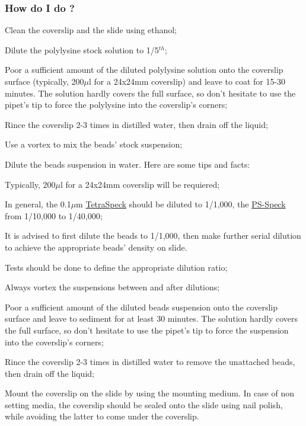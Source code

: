 \documentclass[a4paper, 11pt]{report}%
\begin{document}
\subsubsection{How do I do ?}
\label{sec:gpr-proto-how}

\begin{enumerate*}
	\item Clean the coverslip and the slide using ethanol;
	\item Dilute the polylysine stock solution to 1/5$^{th}$;
	\item Poor a sufficient amount of the diluted polylysine solution onto the coverslip surface (typically, 200$\mu$l for a 24x24mm coverslip) and leave to coat for 15-30 minutes. The solution hardly covers the full surface, so don't hesitate to use the pipet's tip to force the polylysine into the coverslip's corners; 
	\item Rince the coverslip 2-3 times in distilled water, then drain off the liquid;
	\item Use a vortex to mix the beads' stock suspension;
	\item Dilute the beads suspension in water. Here are some tips and facts:
		\begin{itemize*}
			\item Typically, 200$\mu$l for a 24x24mm coverslip will be requiered;
			\item In general, the 0.1$\mu$m \href{http://probes.invitrogen.com/media/pis/mp07279.pdf}{TetraSpeck} should be diluted to 1/1,000, the \href{http://probes.invitrogen.com/media/pis/mp07220.pdf}{PS-Speck} from 1/10,000 to 1/40,000;
			\item It is advised to first dilute the beads to 1/1,000, then make further serial dilution to achieve the appropriate beads' density on slide.
			\item Tests should be done to define the appropriate dilution ratio;
			\item Always vortex the suspensions between and after dilutions;
		\end{itemize*}
	\item Poor a sufficient amount of the diluted beads suspension onto the coverslip surface and leave to sediment for at least 30 minutes. The solution hardly covers the full surface, so don't hesitate to use the pipet's tip to force the suspension into the coverslip's corners; 
	\item Rince the coverslip 2-3 times in distilled water to remove the unattached beads, then drain off the liquid;
	\item Mount the coverslip on the slide by using the mounting medium. In case of non setting media, the coverslip should be sealed onto the slide using nail polish, while avoiding the latter to come under the coverslip.
\end{enumerate*}
\end{document}
